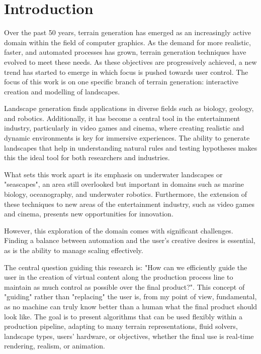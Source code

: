 \chapter{Introduction}
\label{chap:introduction}


Over the past 50 years, terrain generation has emerged as an increasingly active domain within the field of computer graphics. As the demand for more realistic, faster, and automated processes has grown, terrain generation techniques have evolved to meet these needs. As these objectives are progressively achieved, a new trend has started to emerge in which focus is pushed towards user control. The focus of this work is on one specific branch of terrain generation: interactive creation and modelling of landscapes.

Landscape generation finds applications in diverse fields such as biology, geology, and robotics. Additionally, it has become a central tool in the entertainment industry, particularly in video games and cinema, where creating realistic and dynamic environments is key for immersive experiences. The ability to generate landscapes that help in understanding natural rules and testing hypotheses makes this the ideal tool for both researchers and industries.

What sets this work apart is its emphasis on underwater landscapes or "seascapes", an area still overlooked but important in domains such as marine biology, oceanography, and underwater robotics. Furthermore, the extension of these techniques to new areas of the entertainment industry, such as video games and cinema, presents new opportunities for innovation.

However, this exploration of the domain comes with significant challenges. Finding a balance between automation and the user's creative desires is essential, as is the ability to manage scaling effectively.

The central question guiding this research is: "How can we efficiently guide the user in the creation of virtual content along the production process line to maintain as much control as possible over the final product?". This concept of "guiding" rather than "replacing" the user is, from my point of view, fundamental, as no machine can truly know better than a human what the final product should look like. The goal is to present algorithms that can be used flexibly within a production pipeline, adapting to many terrain representations, fluid solvers, landscape types, users' hardware, or objectives, whether the final use is real-time rendering, realism, or animation.

